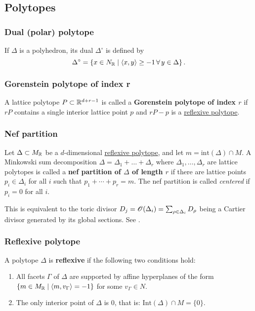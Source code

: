 \documentclass[11pt, english]{article}
\begin{document}
\subsection{Polytopes}

\subsubsection{Dual (polar) polytope}
\label{polarpolyhedron}

If $\Delta$ is a polyhedron, its dual $\Delta^\circ$ is defined by
\[
\Delta^\circ = \left\{ x \in N_{\mathbb{R}} \mid \langle x,y\rangle \geq -1 \,\forall \, y \in \Delta \right\}.
\]

\subsubsection{Gorenstein polytope of index r}
\label{gorensteinpolytope}
A lattice polytope $P \subset \mathbb{R}^{d+r-1}$ is called a \textbf{Gorenstein polytope of index $r$} if $rP$ contains a single interior lattice point $p$ and $rP-p$ is a \hyperref[reflexivepolytope]{reflexive polytope}.

\subsubsection{Nef partition}
\label{nefpartition}
Let $\Delta \subset M_{\mathbb{R}}$ be a $d$-dimensional \hyperref[reflexivepolytope]{reflexive polytope}, and let $m=\mathrm{int}(\Delta) \cap M$. A Minkowski sum decomposition $\Delta=\Delta_1+\dotsc +\Delta_r$ where $\Delta_1,\ldots,\Delta_r$ are lattice polytopes is called a \textbf{nef partition of $\Delta$ of length $r$} if there are lattice points $p_i \in \Delta_i$ for all $i$ such that $p_1+\cdots+p_r = m$. The nef partition is called \emph{centered} if $p_i=0$  for all $i$. 

This is equivalent to the toric divisor $D_j=\operatorname{\mathscr{O}}(\Delta_i)=\sum_{\rho \in \Delta_i} D_\rho$ being a Cartier divisor generated by its global sections. See \cite[Chapter 4.3]{mirrorsymalggeo}.  

\subsubsection{Reflexive polytope}
\label{reflexivepolytope}

A polytope $\Delta$ is \textbf{reflexive} if the following two conditions hold:
\begin{enumerate}
\item All facets $\Gamma$ of $\Delta$ are supported by affine hyperplanes of the form $\{ m \in M_{\mathbb{R}} \mid \langle m,v_\Gamma \rangle = -1 \}$ for some $v_\Gamma \in N$.
\item The only interior point of $\Delta$ is $0$, that is: $\mathrm{Int}(\Delta) \cap M = \{0\}$.
\end{enumerate}
\end{document}
